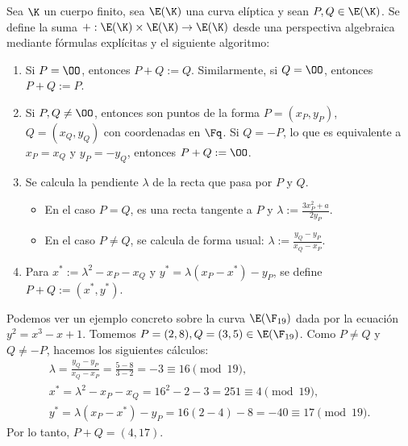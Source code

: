 \begin{definition}
	Sea $\K$ un cuerpo finito, sea $\E(\K)$ una curva elíptica y sean $P, Q \in \E(\K)$. Se define la suma $+: \E(\K) \times \E(\K) \to \E(\K)$ desde una perspectiva algebraica mediante fórmulas explícitas y el siguiente algoritmo:
	\begin{enumerate}
		\item Si $P = \OO$, entonces $P + Q := Q$. Similarmente, si $Q = \OO$, entonces $P + Q := P$.
		\item Si $P, Q \neq \OO$, entonces son puntos de la forma $P = (x_P, y_P)$, $Q = (x_Q, y_Q)$ con coordenadas en $\Fq$. Si $Q = -P$, lo que es equivalente a $x_P = x_Q$ y $y_P = -y_Q$, entonces $P + Q := \OO$.
		\item Se calcula la pendiente $\lambda$ de la recta que pasa por $P$ y $Q$.
		\begin{itemize}
			\item En el caso $P = Q$, es una recta tangente a $P$ y $\lambda := \frac{3x_P^2 + a}{2y_P}$.
			\item En el caso $P \neq Q$, se calcula de forma usual: $\lambda := \frac{y_Q - y_P}{x_Q - x_P}$.
		\end{itemize}
		\item Para $x^* := \lambda^2 - x_P - x_Q$ y $y^* = \lambda(x_P - x^*) - y_P$, se define $P + Q := (x^*, y^*)$.
	\end{enumerate}
\end{definition}

Podemos ver un ejemplo concreto sobre la curva $\E(\F_{19})$ dada por la ecuación $y^2 = x^3 - x + 1$. Tomemos
$P = (2,8), Q = (3,5) \in \E(\F_{19})$. Como $P \neq Q$ y $Q \neq -P$, hacemos los siguientes cálculos:
$$\begin{aligned}
	\lambda = \frac{y_Q - y_P}{x_Q - x_P} = \frac{5 - 8}{3 - 2} = -3 \equiv 16 \pmod{19}, \\
	x^* = \lambda^2 - x_P - x_Q = 16^2 - 2 - 3 = 251 \equiv 4 \pmod{19}, \\
	y^* = \lambda(x_P - x^*) - y_P = 16(2 - 4) - 8 = -40 \equiv 17 \pmod{19}.
\end{aligned}$$
Por lo tanto, $P + Q = (4,17)$.

